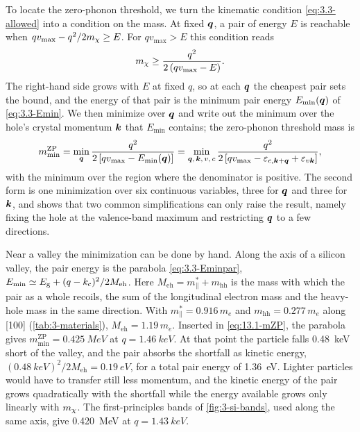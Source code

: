 To locate the zero-phonon threshold, we turn the kinematic condition \cref{eq:3.3-allowed} into a condition on the mass. At fixed $\bm{q}$, a pair of energy $E$ is reachable when $qv_{\mathrm{max}} - q^2/2m_{\chi} \ge E$. For $qv_{\mathrm{max}} > E$ this condition reads
\begin{equation*}
  m_{\chi} \ge \frac{q^2}{2\,(qv_{\mathrm{max}} - E)} .
\end{equation*}
The right-hand side grows with $E$ at fixed $q$, so at each $\bm{q}$ the cheapest pair sets the bound, and the energy of that pair is the minimum pair energy $E_{\mathrm{min}}(\bm{q})$ of \cref{eq:3.3-Emin}. We then minimize over $\bm{q}$ and write out the minimum over the hole's crystal momentum $\bm{k}$ that $E_{\mathrm{min}}$ contains; the zero-phonon threshold mass is
\begin{equation}
  m_{\mathrm{min}}^{\mathrm{ZP}} = \min_{\bm{q}}\frac{q^2}{2\,[qv_{\mathrm{max}} - E_{\mathrm{min}}(\bm{q})]}
  = \min_{\bm{q},\,\bm{k},\,v,\,c}\frac{q^2}{2\,[qv_{\mathrm{max}} - \varepsilon_{c,\bm{k}+\bm{q}} + \varepsilon_{v\bm{k}}]} ,
  \label{eq:13.1-mZP}
\end{equation}
with the minimum over the region where the denominator is positive. The second form is one minimization over six continuous variables, three for $\bm{q}$ and three for $\bm{k}$, and shows that two common simplifications can only raise the result, namely fixing the hole at the valence-band maximum and restricting $\bm{q}$ to a few directions.

Near a valley the minimization can be done by hand. Along the axis of a silicon valley, the pair energy is the parabola \cref{eq:3.3-Eminpar}, $E_{\mathrm{min}} \simeq E_{\mathrm{g}} + (q - k_{\mathrm{c}})^2/2M_{\mathrm{eh}}$. Here $M_{\mathrm{eh}} = m^*_\parallel + m_{\mathrm{hh}}$ is the mass with which the pair as a whole recoils, the sum of the longitudinal electron mass and the heavy-hole mass in the same direction. With $m^*_\parallel = 0.916\,m_e$ and $m_{\mathrm{hh}} = 0.277\,m_e$ along [100] (\cref{tab:3-materials}), $M_{\mathrm{eh}} = 1.19\,m_e$. Inserted in \cref{eq:13.1-mZP}, the parabola gives $m_{\mathrm{min}}^{\mathrm{ZP}} = \SI{0.425}{MeV}$ at $q = \SI{1.46}{keV}$. At that point the particle falls \SI{0.48}{keV} short of the valley, and the pair absorbs the shortfall as kinetic energy, $(\SI{0.48}{keV})^2/2M_{\mathrm{eh}} = \SI{0.19}{eV}$, for a total pair energy of \SI{1.36}{eV}. Lighter particles would have to transfer still less momentum, and the kinetic energy of the pair grows quadratically with the shortfall while the energy available grows only linearly with $m_{\chi}$. The first-principles bands of \cref{fig:3-si-bands}, used along the same axis, give \SI{0.420}{MeV} at $q = \SI{1.43}{keV}$.

